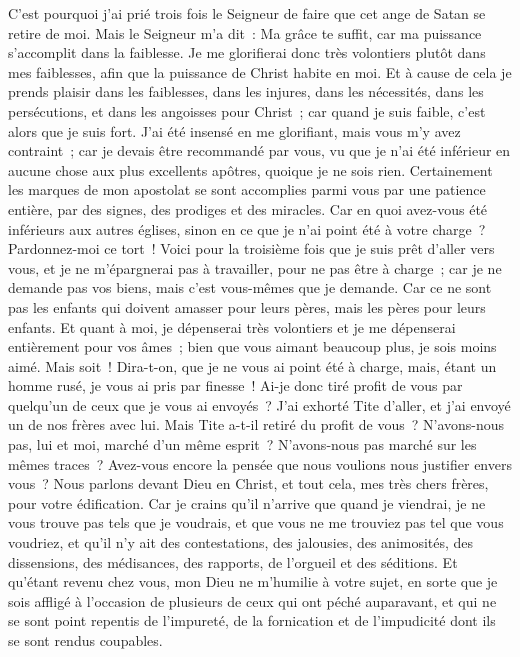 \begin{multicols}{2}
C'est pourquoi j'ai prié trois fois le Seigneur de faire que cet ange de Satan se retire de moi.
Mais le Seigneur m'a dit~: Ma grâce te suffit, car ma puissance s'accomplit dans la faiblesse. Je me glorifierai donc très volontiers plutôt dans mes faiblesses, afin que la puissance de Christ habite en moi.
Et à cause de cela je prends plaisir dans les faiblesses, dans les injures, dans les nécessités, dans les persécutions, et dans les angoisses pour Christ~; car quand je suis faible, c'est alors que je suis fort.
J'ai été insensé en me glorifiant, mais vous m'y avez contraint~; car je devais être recommandé par vous, vu que je n'ai été inférieur en aucune chose aux plus excellents apôtres, quoique je ne sois rien.
Certainement les marques de mon apostolat se sont accomplies parmi vous par une patience entière, par des signes, des prodiges et des miracles.
Car en quoi avez-vous été inférieurs aux autres églises, sinon en ce que je n'ai point été à votre charge~? Pardonnez-moi ce tort~!
Voici pour la troisième fois que je suis prêt d'aller vers vous, et je ne m'épargnerai pas à travailler, pour ne pas être à charge~; car je ne demande pas vos biens, mais c'est vous-mêmes que je demande. Car ce ne sont pas les enfants qui doivent amasser pour leurs pères, mais les pères pour leurs enfants.
Et quant à moi, je dépenserai très volontiers et je me dépenserai entièrement pour vos âmes~; bien que vous aimant beaucoup plus, je sois moins aimé. 
Mais soit~! Dira-t-on, que je ne vous ai point été à charge, mais, étant un homme rusé, je vous ai pris par finesse~!
Ai-je donc tiré profit de vous par quelqu'un de ceux que je vous ai envoyés~?
J'ai exhorté Tite d'aller, et j'ai envoyé un de nos frères avec lui. Mais Tite a-t-il retiré du profit de vous~? N'avons-nous pas, lui et moi, marché d'un même esprit~? N'avons-nous pas marché sur les mêmes traces~?
Avez-vous encore la pensée que nous voulions nous justifier envers vous~? Nous parlons devant Dieu en Christ, et tout cela, mes très chers frères, pour votre édification.
Car je crains qu'il n'arrive que quand je viendrai, je ne vous trouve pas tels que je voudrais, et que vous ne me trouviez pas tel que vous voudriez, et qu'il n'y ait des contestations, des jalousies, des animosités, des dissensions, des médisances, des rapports, de l'orgueil et des séditions.
Et qu'étant revenu chez vous, mon Dieu ne m'humilie à votre sujet, en sorte que je sois affligé à l'occasion de plusieurs de ceux qui ont péché auparavant, et qui ne se sont point repentis de l'impureté, de la fornication et de l'impudicité dont ils se sont rendus coupables.

\end{multicols}
